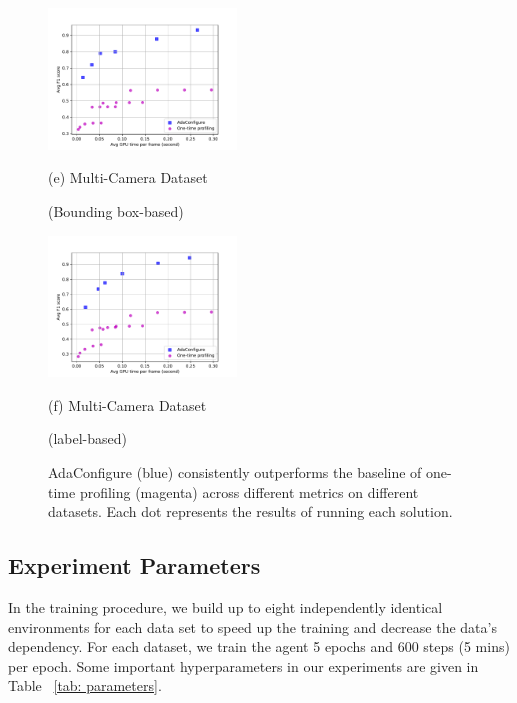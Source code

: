 \begin{figure}[!t]
\begin{minipage}[t]{0.47\linewidth}
	\end{minipage}
	\vfill
	\begin{minipage}[t]{0.47\linewidth}
	\centerline{\includegraphics[width=5cm]{figures/_Westbound_Eastbound_Rear.pdf}}
	\centerline{(e) Multi-Camera Dataset }%
	\centerline{(Bounding box-based)}
	\end{minipage}
	\hfill
	\begin{minipage}[t]{0.47\linewidth}
	\centerline{\includegraphics[width=5cm]{figures/_Westbound_Eastbound_Rear_label.pdf}}
	\centerline{(f) Multi-Camera Dataset }%
	\centerline{(label-based)}
	\end{minipage}		
	\caption{AdaConfigure (blue) consistently outperforms the baseline of one-time profiling (magenta) across different metrics on different datasets. Each dot represents the results of running each solution.}
	\label{fig: results}
\end{figure}

\subsection{Experiment Parameters}
In the training procedure, we build up to eight independently identical environments for each data set to speed up the training and decrease the data's dependency. For each dataset, we train the agent 5 epochs and 600 steps (5 mins) per epoch. Some important hyperparameters in our experiments are given in Table ~\ref{tab: parameters}.

